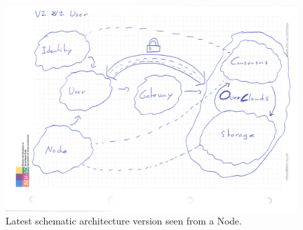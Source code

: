 \begin{figure}[htpb]
\centering
\begin{adjustbox}{center}
\includegraphics[scale=0.15]{annexes/concepts/Architecture-Draft-global-view-idea-2.jpeg}
\end{adjustbox}
\caption{Latest schematic architecture version seen from a Node.
\label{img:latest-schematic-architecture-node}}  
\end{figure}


